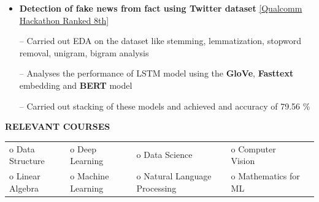 \documentclass{article}
\begin{document}
\begin{itemize}
\item \textbf{Detection of fake news from fact using Twitter dataset}
\hfill{\href{https://drive.google.com/file/d/1mOlilPLZSuHSyqRIVukRvXs_700Hmz5I/view?usp=sharing}{[Qualcomm Hackathon Ranked 8th]}}
\item[--] Carried out EDA on the dataset like stemming, lemmatization, stopword removal, unigram, bigram analysis
\item[--] Analyses the performance of LSTM model using the \textbf{GloVe}, \textbf{Fasttext} embedding and \textbf{BERT}  model
\item[--] Carried out stacking of these models and achieved and accuracy of 79.56 \%
\end{itemize}


\vspace{-2.7mm}




 \begin{theorem}
   \vspace{-0.7mm}
\begin{center}
\textbf{ RELEVANT COURSES
}\end{center}  
\vspace{-0.7mm}    
   \end{theorem}
\vspace{-2.5mm}

\begin{table}[htbp]

\centering
\begin{tabular}{lllll}

  o Data Structure & o Deep Learning &   o  Data Science   &  o Computer Vision  &  \\
o Linear Algebra & o Machine Learning &  o Natural Language Processing  & o Mathematics for ML
\end{tabular}
\end{table}
\vspace{-3.5mm}
\end{document}
